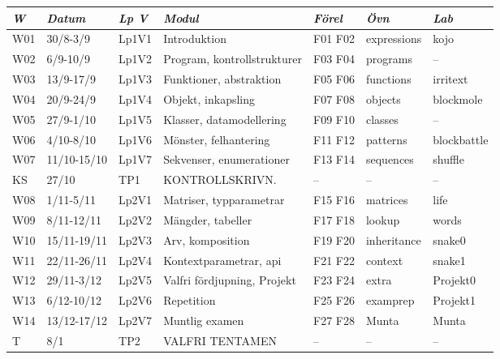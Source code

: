 \begin{tabular}{l|l|l|l|l|l|l}
\textit{W} & \textit{Datum} & \textit{Lp V} & \textit{Modul} & \textit{Förel} & \textit{Övn} & \textit{Lab} \\ \hline \hline
W01 & 30/8-3/9 & Lp1V1 & Introduktion & F01 F02 & expressions & kojo \\
W02 & 6/9-10/9 & Lp1V2 & Program, kontrollstrukturer & F03 F04 & programs & -- \\
W03 & 13/9-17/9 & Lp1V3 & Funktioner, abstraktion & F05 F06 & functions & irritext \\
W04 & 20/9-24/9 & Lp1V4 & Objekt, inkapsling & F07 F08 & objects & blockmole \\
W05 & 27/9-1/10 & Lp1V5 & Klasser, datamodellering & F09 F10 & classes & -- \\
W06 & 4/10-8/10 & Lp1V6 & Mönster, felhantering & F11 F12 & patterns & blockbattle \\
W07 & 11/10-15/10 & Lp1V7 & Sekvenser, enumerationer & F13 F14 & sequences & shuffle \\
KS & 27/10 & TP1 & KONTROLLSKRIVN. & -- & -- & -- \\
W08 & 1/11-5/11 & Lp2V1 & Matriser, typparametrar & F15 F16 & matrices & life \\
W09 & 8/11-12/11 & Lp2V2 & Mängder, tabeller & F17 F18 & lookup & words \\
W10 & 15/11-19/11 & Lp2V3 & Arv, komposition & F19 F20 & inheritance & snake0 \\
W11 & 22/11-26/11 & Lp2V4 & Kontextparametrar, api & F21 F22 & context & snake1 \\
W12 & 29/11-3/12 & Lp2V5 & Valfri fördjupning, Projekt & F23 F24 & extra & Projekt0 \\
W13 & 6/12-10/12 & Lp2V6 & Repetition & F25 F26 & examprep & Projekt1 \\
W14 & 13/12-17/12 & Lp2V7 & Muntlig examen & F27 F28 & Munta & Munta \\
T & 8/1 & TP2 & VALFRI TENTAMEN & -- & -- & -- \\
\end{tabular}
